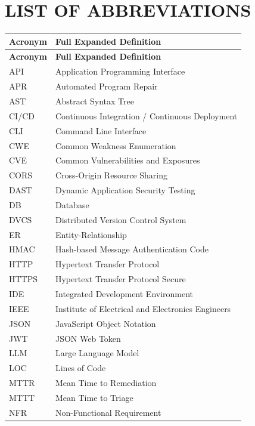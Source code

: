 \documentclass[12pt,a4paper,oneside]{report}
\begin{document}
\cleardoublepage

\chapter*{LIST OF ABBREVIATIONS}

\begin{longtable}{p{} p{}}
\toprule
\textbf{Acronym} & \textbf{Full Expanded Definition} \\
\midrule
\endfirsthead
\toprule
\textbf{Acronym} & \textbf{Full Expanded Definition} \\
\midrule
\endhead
\bottomrule
\endfoot
\bottomrule
\endlastfoot

API & Application Programming Interface \\
APR & Automated Program Repair \\
AST & Abstract Syntax Tree \\
CI/CD & Continuous Integration / Continuous Deployment \\
CLI & Command Line Interface \\
CWE & Common Weakness Enumeration \\
CVE & Common Vulnerabilities and Exposures \\
CORS & Cross-Origin Resource Sharing \\
DAST & Dynamic Application Security Testing \\
DB & Database \\
DVCS & Distributed Version Control System \\
ER & Entity-Relationship \\
HMAC & Hash-based Message Authentication Code \\
HTTP & Hypertext Transfer Protocol \\
HTTPS & Hypertext Transfer Protocol Secure \\
IDE & Integrated Development Environment \\
IEEE & Institute of Electrical and Electronics Engineers \\
JSON & JavaScript Object Notation \\
JWT & JSON Web Token \\
LLM & Large Language Model \\
LOC & Lines of Code \\
MTTR & Mean Time to Remediation \\
MTTT & Mean Time to Triage \\
NFR & Non-Functional Requirement \\

\end{longtable}
\end{document}

